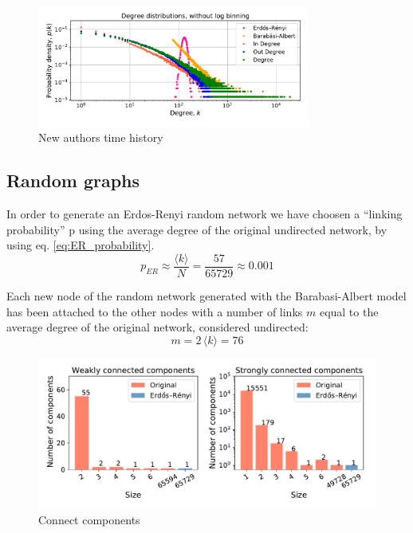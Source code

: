 \documentclass[12pt, twoside]{report}
\begin{document}
 \begin{figure}[htbp]
      \centering
      \includegraphics[width=0.8\textwidth]{../../scripts/network_analysis/imgs/degree_distributions_nobinlog.pdf}            
      \caption{New authors time history}
      \label{fig:degree}
    \end{figure}


    \subsection{Random graphs} 
    In order to generate an Erdos-Renyi random network we have choosen a ``linking probability'' p using the average degree of the original undirected network, by using eq. \ref{eq:ER_probability}.
    \begin{equation}
      p_{ER} \approx \frac{\langle k  \rangle}{N} = \frac{57}{65729} \approx  0.001
      \label{eq:ER_probability}
    \end{equation}

    Each new node of the random network generated with the Barabasi-Albert model has been attached to the other nodes with a number of links $m$ equal to the average degree of the original network, considered undirected:
    \begin{equation}
      m = 2 \, \langle k \rangle = 76
      \label{eq:BA_model}
    \end{equation}

    
    \begin{figure}[htbp]
      \centering
      \includegraphics[width=\textwidth]{../../scripts/network_analysis/imgs/connectivity.pdf}            
      \caption{Connect components}
      \label{fig:connectivity}
    \end{figure}
\end{document}
